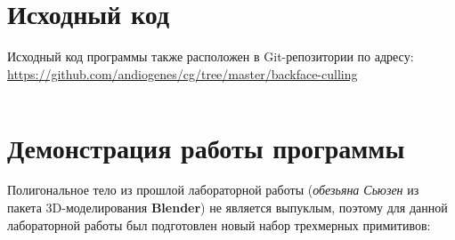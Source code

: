 \documentclass[a4paper,12pt]{article}
\begin{document}
\section{\normalsize{Исходный код}}
Исходный код программы также расположен в Git-репозитории по адресу: \url{https://github.com/andiogenes/cg/tree/master/backface-culling}
\inputminted[breaklines]{python}{../culling.py}

\section{\normalsize{Демонстрация работы программы}}
\begin{flushleft}
  Полигональное тело из прошлой лабораторной работы (\textit{обезьяна Сьюзен} из пакета 3D-моделирования \textbf{Blender}) не является выпуклым, поэтому для данной лабораторной работы был подготовлен новый набор трехмерных примитивов:
\end{flushleft}
\end{document}
